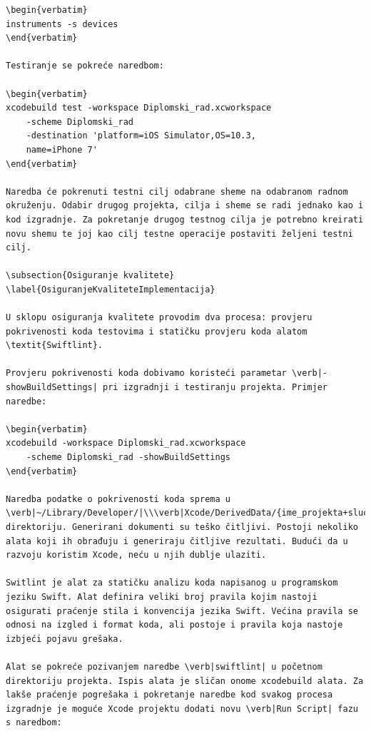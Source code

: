 \documentclass[times, utf8, diplomski, numeric]{fer}
\begin{document}
\begin{appendices}
\begin{lstlisting}[caption=Provjera postojanja i pokretanje Swiftlint alata, label=listing:swiftlint]
\begin{verbatim}
instruments -s devices
\end{verbatim}

Testiranje se pokreće naredbom:

\begin{verbatim}
xcodebuild test -workspace Diplomski_rad.xcworkspace
    -scheme Diplomski_rad
    -destination 'platform=iOS Simulator,OS=10.3,
    name=iPhone 7'
\end{verbatim}

Naredba će pokrenuti testni cilj odabrane sheme na odabranom radnom okruženju. Odabir drugog projekta, cilja i sheme se radi jednako kao i kod izgradnje. Za pokretanje drugog testnog cilja je potrebno kreirati novu shemu te joj kao cilj testne operacije postaviti željeni testni cilj.

\subsection{Osiguranje kvalitete} \label{OsiguranjeKvaliteteImplementacija}

U sklopu osiguranja kvalitete provodim dva procesa: provjeru pokrivenosti koda testovima i statičku provjeru koda alatom \textit{Swiftlint}.

Provjeru pokrivenosti koda dobivamo koristeći parametar \verb|-showBuildSettings| pri izgradnji i testiranju projekta. Primjer naredbe:

\begin{verbatim}
xcodebuild -workspace Diplomski_rad.xcworkspace
    -scheme Diplomski_rad -showBuildSettings
\end{verbatim}

Naredba podatke o pokrivenosti koda sprema u \verb|~/Library/Developer/|\\\verb|Xcode/DerivedData/{ime_projekta+slučajan_identifikator}/|\\\verb|Build/Intermediates/CodeCoverage| direktoriju. Generirani dokumenti su teško čitljivi. Postoji nekoliko alata koji ih obrađuju i generiraju čitljive rezultati. Budući da u razvoju koristim Xcode, neću u njih dublje ulaziti.

Switlint je alat za statičku analizu koda napisanog u programskom jeziku Swift. Alat definira veliki broj pravila kojim nastoji osigurati praćenje stila i konvencija jezika Swift. Većina pravila se odnosi na izgled i format koda, ali postoje i pravila koja nastoje izbjeći pojavu grešaka.

Alat se pokreće pozivanjem naredbe \verb|swiftlint| u početnom direktoriju projekta. Ispis alata je sličan onome xcodebuild alata. Za lakše praćenje pogrešaka i pokretanje naredbe kod svakog procesa izgradnje je moguće Xcode projektu dodati novu \verb|Run Script| fazu s naredbom:


\end{lstlisting}
\end{appendices}
\end{document}
